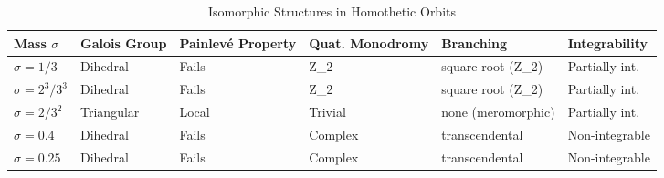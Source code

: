 \begin{table}[h]
\centering
\caption{Isomorphic Structures in Homothetic Orbits}
\label{tab:homothetic_isomorphic}
\small
\begin{tabularx}{\textwidth}{lXXXXX}
\toprule
Mass $\sigma$ & Galois Group & Painlevé Property & Quat. Monodromy & Branching & Integrability \\
\midrule
$\sigma = 1/3$ & Dihedral & Fails & Z_2 & square root (Z_2) & Partially int. \\
$\sigma = 2^3/3^3$ & Dihedral & Fails & Z_2 & square root (Z_2) & Partially int. \\
$\sigma = 2/3^2$ & Triangular & Local & Trivial & none (meromorphic) & Partially int. \\
$\sigma = 0.4$ & Dihedral & Fails & Complex & transcendental & Non-integrable \\
$\sigma = 0.25$ & Dihedral & Fails & Complex & transcendental & Non-integrable \\
\bottomrule
\end{tabularx}
\end{table}
